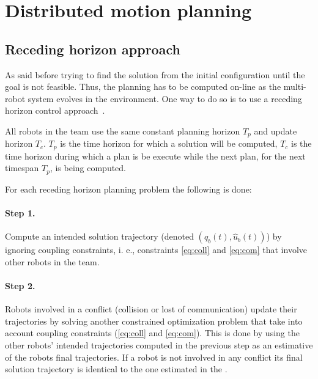 \documentclass[eprint]{actapoly}
\begin{document}
\section{Distributed motion planning}



\subsection{Receding horizon approach}\label{subsec:rha}


As said before trying to find the solution from the initial configuration
until the goal is not feasible. Thus, the planning has to be computed on-line
as the multi-robot system evolves in the environment.
One way to do so is to use a receding horizon control approach~\cite{Keviczky2006}.


All robots in the team use the same constant planning horizon $T_p$ and update
horizon $T_c$. $T_p$ is the time horizon for which a solution will be computed,
$T_c$ is the time horizon during which a plan is be execute while the
next plan, for the next timespan $T_p$, is being computed.


For each receding horizon planning problem the following is done:
\paragraph{Step 1.}\label{step1} Compute an intended solution trajectory (denoted $(\hat{q}_b(t), \hat{u}_b(t))$)
by ignoring coupling
constraints, i. e., constraints \ref{eq:coll} and \ref{eq:com} that involve other
robots in the team.
\paragraph{Step 2.}\label{step2} Robots involved in a conflict (collision or lost of communication)
update their trajectories
by solving another constrained optimization problem that take into account
coupling constraints (\ref{eq:coll} and \ref{eq:com}).
This is done by using the other robots' intended
trajectories computed in the previous step as an estimative of the robots
final trajectories. If a robot is not involved in any conflict its final
solution trajectory is identical to the one estimated in the .
\end{document}
